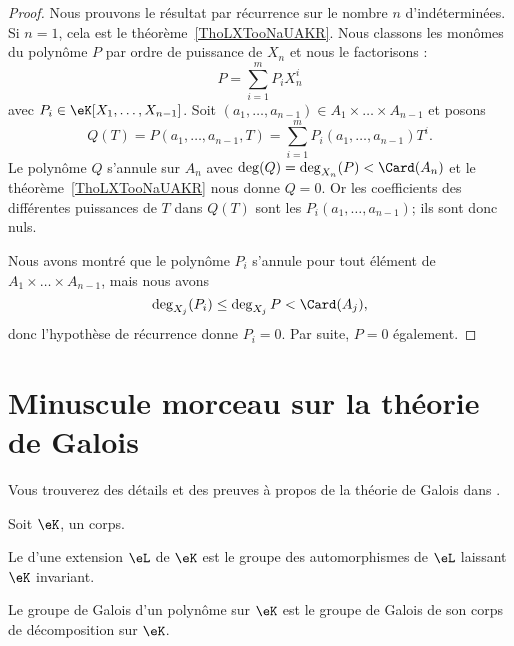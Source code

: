 \begin{proof}
	Nous prouvons le résultat par récurrence sur le nombre \( n\) d'indéterminées. Si \( n=1\), cela est le théorème~\ref{ThoLXTooNaUAKR}. Nous classons les monômes du polynôme \( P\) par ordre de puissance de \( X_n\) et nous le factorisons :
	\begin{equation}
		P=\sum_{i=1}^mP_iX_n^i
	\end{equation}
	avec \( P_i\in \eK[X_1,\ldots, X_{n-1}]\). Soit \( (a_1,\ldots, a_{n-1})\in A_1\times \ldots \times A_{n-1}\) et posons
	\begin{equation}
		Q(T)=P(a_1,\ldots, a_{n-1},T)= \sum_{i=1}^mP_i(a_1,\ldots, a_{n-1})T^i.
	\end{equation}
	Le polynôme \( Q\) s'annule sur \( A_n\) avec \( \deg(Q)=\deg_{X_n}(P)<\Card(A_n)\) et le théorème~\ref{ThoLXTooNaUAKR} nous donne \( Q=0\). Or les coefficients des différentes puissances de \( T\) dans \( Q(T) \) sont les \( P_i(a_1,\ldots, a_{n-1})\); ils sont donc nuls.

	Nous avons montré que le polynôme \( P_i\) s'annule pour tout élément de \( A_1\times \ldots \times A_{n-1}\), mais nous avons
	\begin{equation}
		\deg_{X_j}(P_i)\leq \deg_{X_j}P<\Card(A_j),
	\end{equation}
	donc l'hypothèse de récurrence donne \( P_i=0\). Par suite, \( P=0\) également.
\end{proof}

\section{Minuscule morceau sur la théorie de Galois}

Vous trouverez des détails et des preuves à propos de la théorie de Galois dans \cite{GalIEl,rqrNyg}.

\begin{definition}
	Soit \( \eK\), un corps.

	Le  d'une extension \( \eL\) de \( \eK\) est le groupe des automorphismes de \( \eL\) laissant \( \eK\) invariant.

	Le groupe de Galois d'un polynôme sur \( \eK\) est le groupe de Galois de son corps de décomposition sur \( \eK\).
\end{definition}


